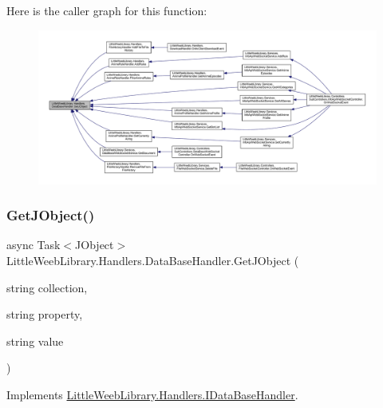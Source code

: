 Here is the caller graph for this function\+:\nopagebreak
\begin{figure}[H]
\begin{center}
\leavevmode
\includegraphics[width=350pt]{class_little_weeb_library_1_1_handlers_1_1_data_base_handler_a7f61583807f99b7838a33d2db0f7ca68_icgraph}
\end{center}
\end{figure}
\mbox{\label{class_little_weeb_library_1_1_handlers_1_1_data_base_handler_a4d7ed521cd4bedc0d650bc01afc67587}} 
\subsubsection{\texorpdfstring{Get\+J\+Object()}{GetJObject()}\hspace{0.1cm}{\footnotesize\ttfamily [2/2]}}
{\footnotesize\ttfamily async Task$<$J\+Object$>$ Little\+Weeb\+Library.\+Handlers.\+Data\+Base\+Handler.\+Get\+J\+Object (\begin{DoxyParamCaption}\item[{string}]{collection,  }\item[{string}]{property,  }\item[{string}]{value }\end{DoxyParamCaption})}



Implements \mbox{\hyperlink{interface_little_weeb_library_1_1_handlers_1_1_i_data_base_handler_a9d9a8fc06ab8431daa5363becf79cf65}{Little\+Weeb\+Library.\+Handlers.\+I\+Data\+Base\+Handler}}.



